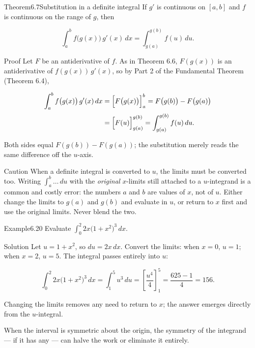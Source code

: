 \documentclass[a4paper,12pt,oneside]{memoir}
\begin{document}
\begin{envtheorem}{Theorem}{6.7}{Substitution in a definite integral}
If \(g'\) is continuous on \([a, b]\) and \(f\) is continuous on the range of \(g\), then

\[ \int_{a}^{b} f\bigl(g(x)\bigr)\,g'(x)\,dx = \int_{g(a)}^{g(b)} f(u)\,du. \]
\end{envtheorem}
\begin{envproof}{Proof}{}{}
Let \(F\) be an antiderivative of \(f\). As in Theorem 6.6, \(F(g(x))\) is an antiderivative of \(f(g(x))\,g'(x)\), so by Part 2 of the Fundamental Theorem (Theorem 6.4),

\[ \begin{aligned}
        \int_{a}^{b} f\bigl(g(x)\bigr)\,g'(x)\,dx &= \Bigl[F\bigl(g(x)\bigr)\Bigr]_{a}^{b} = F\bigl(g(b)\bigr) - F\bigl(g(a)\bigr) \\[2pt]
                                                  &= \Bigl[F(u)\Bigr]_{g(a)}^{g(b)} = \int_{g(a)}^{g(b)} f(u)\,du.
      \end{aligned} \]

Both sides equal \(F(g(b)) - F(g(a))\); the substitution merely reads the same difference off the \(u\)-axis. \qedmark
\end{envproof}
\begin{envcaution}{Caution}{}{}
When a definite integral is converted to \(u\), the limits must be converted too. Writing \(\int_{a}^{b} \dots\,du\) with the \emph{original} \(x\)-limits still attached to a \(u\)-integrand is a common and costly error: the numbers \(a\) and \(b\) are values of \(x\), not of \(u\). Either change the limits to \(g(a)\) and \(g(b)\) and evaluate in \(u\), or return to \(x\) first and use the original limits. Never blend the two.
\end{envcaution}
\begin{workedexample}
\begin{envexample}{Example}{6.20}{}
Evaluate \(\displaystyle\int_{0}^{2} 2x\bigl(1 + x^{2}\bigr)^{3}\,dx\).
\end{envexample}
\begin{envsolution}{Solution}{}{}
Let \(u = 1 + x^{2}\), so \(du = 2x\,dx\). Convert the limits: when \(x = 0\), \(u = 1\); when \(x = 2\), \(u = 5\). The integral passes entirely into \(u\):

\[ \int_{0}^{2} 2x\bigl(1 + x^{2}\bigr)^{3}\,dx = \int_{1}^{5} u^{3}\,du = \left[\frac{u^{4}}{4}\right]_{1}^{5} = \frac{625 - 1}{4} = 156. \]

Changing the limits removes any need to return to \(x\); the answer emerges directly from the \(u\)-integral. \qedmark
\end{envsolution}
\end{workedexample}
When the interval is symmetric about the origin, the symmetry of the integrand — if it has any — can halve the work or eliminate it entirely.
\end{document}
